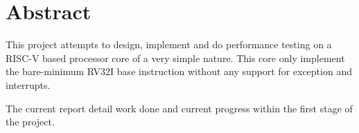 \hypertarget{abstract}{%
\chapter*{Abstract}\label{abstract}}

This project attempts to design, implement and do performance testing on a RISC-V based processor
core of a very simple nature. This core only implement the bare-minimum RV32I base instruction
without any support for exception and interrupts. 

The current report detail work done and current progress within the first stage of the project.

